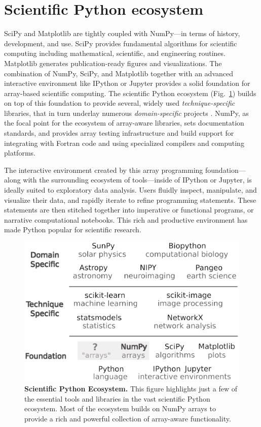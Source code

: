 \section*{Scientific Python ecosystem}

SciPy and Matplotlib are tightly coupled with NumPy---in terms of
history, development, and use.
SciPy provides fundamental algorithms for scientific computing
including mathematical, scientific, and engineering routines.
Matplotlib generates publication-ready figures and visualizations.
The combination of NumPy, SciPy, and Matplotlib together with
an advanced interactive environment like IPython \cite{perez2007ipython}
or Jupyter \cite{Kluyver:2016aa}
provides a solid foundation for array-based scientific computing.
The scientific Python ecosystem (Fig.~\ref{fig:ecosystem}) builds on top of
this foundation to provide several, widely used \emph{technique-specific}
libraries\cite{pedregosa2011scikit,vanderwalt2014scikit,SciPyProceedings_11},
that in turn underlay numerous \emph{domain-specific} projects
\cite{astropy:2013,astropy:2018,cock2009biopython,millman2007analysis,sunpy2015,2018EGUGA..2012146H}.
NumPy, as the focal point for the ecosystem of array-aware libraries,
sets documentation standards, and provides array testing infrastructure
and build support for integrating with Fortran code and using specialized
compilers and computing platforms.

The interactive environment created by this array programming
foundation---along with the surrounding ecosystem of tools---inside of
IPython or Jupyter, is ideally suited to exploratory data analysis.
Users fluidly inspect, manipulate, and visualize their data, and
rapidly iterate to refine programming statements. These statements are
then stitched together into imperative or functional programs, or
narrative computational notebooks.  This rich and productive
environment has made Python popular
for scientific research.

\begin{figure}
  \centering
  \includegraphics[width=.45\textwidth]{static/ecosystem}
  \caption{\textbf{Scientific Python Ecosystem.}
   This figure highlights just a few of the essential tools and libraries in the vast
   scientific Python ecosystem.  Most of the ecosystem builds on NumPy arrays to
   provide a rich and powerful collection of array-aware functionality.
  }
  \label{fig:ecosystem}
\end{figure}

